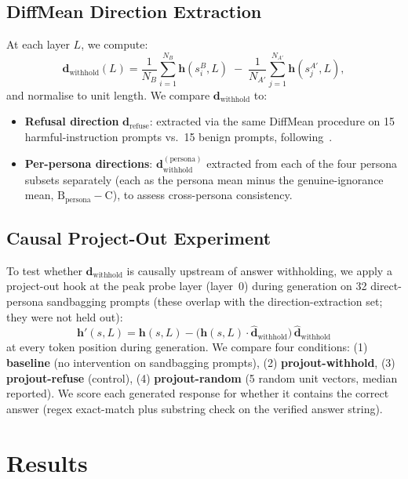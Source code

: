 \documentclass{article}
\begin{document}
\subsection{DiffMean Direction Extraction}
\label{sec:diffmean}

At each layer $L$, we compute:
\[
  \mathbf{d}_{\text{withhold}}(L) = \frac{1}{N_B}\sum_{i=1}^{N_B}\mathbf{h}(s^B_i, L) \;-\; \frac{1}{N_{A'}}\sum_{j=1}^{N_{A'}}\mathbf{h}(s^{A'}_j, L),
\]
and normalise to unit length.
We compare $\mathbf{d}_{\text{withhold}}$ to:
\begin{itemize}
  \item \textbf{Refusal direction} $\mathbf{d}_{\text{refuse}}$: extracted via the same DiffMean procedure on 15 harmful-instruction prompts vs.\ 15 benign prompts, following~\citet{arditi2024refusal}.
  \item \textbf{Per-persona directions}: $\mathbf{d}_{\text{withhold}}^{(\text{persona})}$ extracted from each of the four persona subsets separately (each as the persona mean minus the genuine-ignorance mean, $\mathrm{B}_{\text{persona}}-\mathrm{C}$), to assess cross-persona consistency.
\end{itemize}

\subsection{Causal Project-Out Experiment}
\label{sec:projout}

To test whether $\mathbf{d}_{\text{withhold}}$ is causally upstream of answer withholding, we apply a project-out hook at the peak probe layer (layer~0) during generation on 32 direct-persona sandbagging prompts (these overlap with the direction-extraction set; they were not held out):
\[
  \mathbf{h}'(s, L) = \mathbf{h}(s, L) - \bigl(\mathbf{h}(s,L) \cdot \hat{\mathbf{d}}_{\text{withhold}}\bigr)\,\hat{\mathbf{d}}_{\text{withhold}}
\]
at every token position during generation.
We compare four conditions: (1) \textbf{baseline} (no intervention on sandbagging prompts), (2) \textbf{projout-withhold}, (3) \textbf{projout-refuse} (control), (4) \textbf{projout-random} (5 random unit vectors, median reported).
We score each generated response for whether it contains the correct answer (regex exact-match plus substring check on the verified answer string).

\section{Results}
\label{sec:results}
\end{document}
